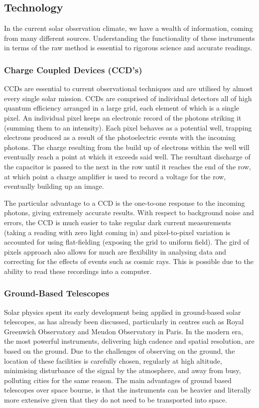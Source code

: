 \subsection{Technology}

In the current solar observation climate, we have a wealth of information, coming from many different sources.
Understanding the functionality of these instruments in terms of the raw method is essential to rigorous science and accurate readings.

\subsubsection{Charge Coupled Devices (CCD's)}

CCDs are essential to current observational techniques and are utilised by almost every single solar mission.
CCDs are comprised of individual detectors all of high quantum efficiency arranged in a large grid, each element of which is a single pixel.
An individual pixel keeps an electronic record of the photons striking it (summing them to an intensity).
Each pixel behaves as a potential well, trapping electrons produced as a result of the photoelectric events with the incoming photons.
The charge resulting from the build up of electrons within the well will eventually reach a point at which it exceeds said well.
The resultant discharge of the capacitor is passed to the next in the row until it reaches the end of the row, at which point a charge amplifier is used to record a voltage for the row, eventually building up an image.

The particular advantage to a CCD is the one-to-one response to the incoming photons, giving extremely accurate results.
With respect to background noise and errors, the CCD is much easier to take regular dark current measurements (taking a reading with zero light coming in) and pixel-to-pixel variation is accounted for using flat-fielding (exposing the grid to uniform field).
The gird of pixels approach also allows for much are flexibility in analysing data and correcting for the effects of events such as cosmic rays.
This is possible due to the ability to read these recordings into a computer.

\subsubsection{Ground-Based Telescopes}

Solar physics spent its early development being applied in ground-based solar telescopes, as has already been discussed, particularly in centres such as Royal Greenwich Observatory and Meudon Observatory in Paris.
In the modern era, the most powerful instruments, delivering high cadence and spatial resolution, are based on the ground.
Due to the challenges of observing on the ground, the location of these facilities is carefully chosen, regularly at high altitude, minimising disturbance of the signal by the atmosphere, and away from busy, polluting cities for the same reason.
The main advantages of ground based telescopes over space bourne, is that the instruments can be heavier and literally more extensive given that they do not need to be transported into space.

